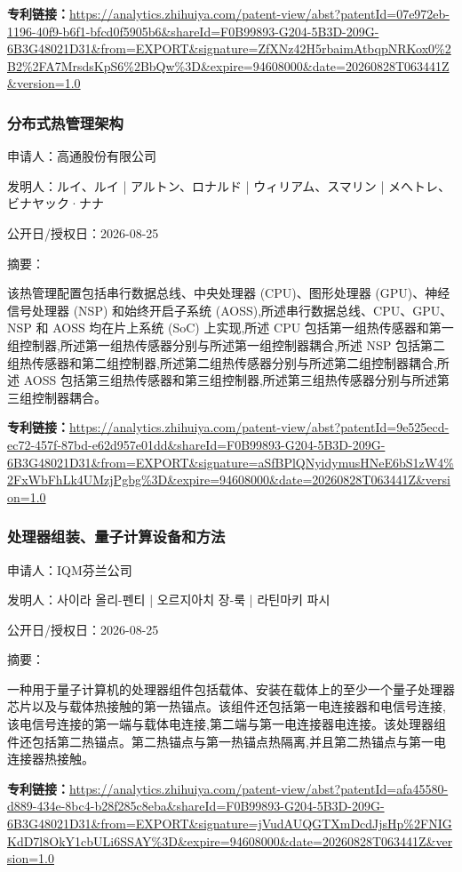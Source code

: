 \documentclass[12pt,a4paper]{ctexart}
\begin{document}
\noindent\textbf{专利链接：}\url{https://analytics.zhihuiya.com/patent-view/abst?patentId=07e972eb-1196-40f9-b6f1-bfcd0f5905b6&shareId=F0B99893-G204-5B3D-209G-6B3G48021D31&from=EXPORT&signature=ZfXNz42H5rbaimAtbqpNRKox0%2B2%2FA7MrsdsKpS6%2BbQw%3D&expire=94608000&date=20260828T063441Z&version=1.0}

\subsubsection{ 分布式热管理架构 }

申请人：高通股份有限公司

发明人：ルイ、ルイ | アルトン、ロナルド | ウィリアム、スマリン | メへトレ、ビナヤック·ナナ

公开日/授权日：2026-08-25

摘要：

该热管理配置包括串行数据总线、中央处理器 (CPU)、图形处理器 (GPU)、神经信号处理器 (NSP) 和始终开启子系统 (AOSS),所述串行数据总线、CPU、GPU、NSP 和 AOSS 均在片上系统 (SoC) 上实现,所述 CPU 包括第一组热传感器和第一组控制器,所述第一组热传感器分别与所述第一组控制器耦合,所述 NSP 包括第二组热传感器和第二组控制器,所述第二组热传感器分别与所述第二组控制器耦合,所述 AOSS 包括第三组热传感器和第三组控制器,所述第三组热传感器分别与所述第三组控制器耦合。

\noindent\textbf{专利链接：}\url{https://analytics.zhihuiya.com/patent-view/abst?patentId=9e525ecd-ec72-457f-87bd-e62d957e01dd&shareId=F0B99893-G204-5B3D-209G-6B3G48021D31&from=EXPORT&signature=aSfBPlQNyidymusHNeE6bS1zW4%2FxWbFhLk4UMzjPgbg%3D&expire=94608000&date=20260828T063441Z&version=1.0}

\subsubsection{ 处理器组装、量子计算设备和方法 }

申请人：IQM芬兰公司

发明人：사이라 올리-펜티 | 오르지아치 장-룩 | 라틴마키 파시

公开日/授权日：2026-08-25

摘要：

一种用于量子计算机的处理器组件包括载体、安装在载体上的至少一个量子处理器芯片以及与载体热接触的第一热锚点。该组件还包括第一电连接器和电信号连接,该电信号连接的第一端与载体电连接,第二端与第一电连接器电连接。该处理器组件还包括第二热锚点。第二热锚点与第一热锚点热隔离,并且第二热锚点与第一电连接器热接触。

\noindent\textbf{专利链接：}\url{https://analytics.zhihuiya.com/patent-view/abst?patentId=afa45580-d889-434e-8bc4-b28f285c8eba&shareId=F0B99893-G204-5B3D-209G-6B3G48021D31&from=EXPORT&signature=jVudAUQGTXmDcdJjsHp%2FNIGKdD7l8OkY1cbULi6SSAY%3D&expire=94608000&date=20260828T063441Z&version=1.0}
\end{document}
